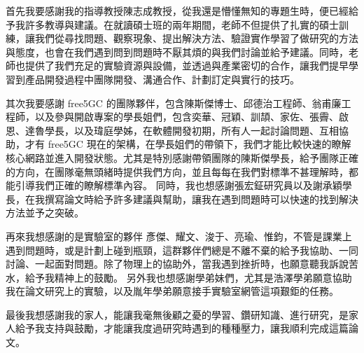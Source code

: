\begin{acknowledgement}%

    首先我要感謝我的指導教授陳志成教授，從我還是懵懂無知的專題生時，便已經給予我許多教導與建議。在就讀碩士班的兩年期間，老師不但提供了扎實的碩士訓練，讓我們從尋找問題、觀察現象、提出解決方法、驗證實作學習了做研究的方法與態度，也會在我們遇到問到問題時不厭其煩的與我們討論並給予建議。同時，老師也提供了我們充足的實驗資源與設備，並透過與產業密切的合作，讓我們提早學習到產品開發過程中團隊開發、溝通合作、計劃訂定與實行的技巧。

    其次我要感謝 free5GC 的團隊夥伴，包含陳斯傑博士、邱德治工程師、翁甫廉工程師，以及參與開啟專案的學長姐們，包含奕華、冠穎、訓頡、家佐、張霽、啟恩、達魯學長，以及瑋庭學姊，在軟體開發初期，所有人一起討論問題、互相協助，才有 free5GC 現在的架構，在學長姐們的帶領下，我們才能比較快速的瞭解核心網路並進入開發狀態。尤其是特別感謝帶領團隊的陳斯傑學長，給予團隊正確的方向，在團隊毫無頭緒時提供我們方向，並且每每在我們對標準不甚理解時，都能引導我們正確的瞭解標準內容。
    同時，我也想感謝張宏鉦研究員以及謝承穎學長，在我撰寫論文時給予許多建議與幫助，讓我在遇到問題時可以快速的找到解決方法並予之突破。

    再來我想感謝的是實驗室的夥伴 彥傑、耀文、浚于、亮瑜、惟鈞，不管是課業上遇到問題時，或是計劃上碰到瓶頸，這群夥伴們總是不離不棄的給予我協助、一同討論、一起面對問題。除了物理上的協助外，當我遇到挫折時，也願意聽我訴說苦水，給予我精神上的鼓勵。
    另外我也想感謝學弟妹們，尤其是浩澤學弟願意協助我在論文研究上的實驗，以及胤年學弟願意接手實驗室網管這項艱鉅的任務。

    最後我想感謝我的家人，能讓我毫無後顧之憂的學習、鑽研知識、進行研究，是家人給予我支持與鼓勵，才能讓我度過研究時遇到的種種壓力，讓我順利完成這篇論文。

\end{acknowledgement}

